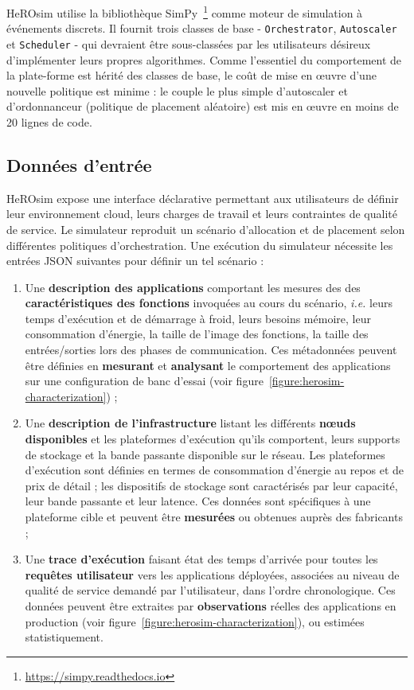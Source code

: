 HeROsim utilise la bibliothèque SimPy~\footnote{\href{https://simpy.readthedocs.io}{https://simpy.readthedocs.io}} comme moteur de simulation à événements discrets. Il fournit trois classes de base - \texttt{Orchestrator}, \texttt{Autoscaler} et \texttt{Scheduler} - qui devraient être sous-classées par les utilisateurs désireux d'implémenter leurs propres algorithmes. Comme l'essentiel du comportement de la plate-forme est hérité des classes de base, le coût de mise en œuvre d'une nouvelle politique est minime : le couple le plus simple d'autoscaler et d'ordonnanceur (politique de placement aléatoire) est mis en œuvre en moins de 20 lignes de code.

\subsection{Données d'entrée}

HeROsim expose une interface déclarative permettant aux utilisateurs de définir leur environnement cloud, leurs charges de travail et leurs contraintes de qualité de service. Le simulateur reproduit un scénario d'allocation et de placement selon différentes politiques d'orchestration. Une exécution du simulateur nécessite les entrées JSON suivantes pour définir un tel scénario :

\begin{enumerate}
    \item Une \textbf{description des applications} comportant les mesures des des \textbf{caractéristiques des fonctions} invoquées au cours du scénario, \textit{i.e.} leurs temps d'exécution et de démarrage à froid, leurs besoins mémoire, leur consommation d'énergie, la taille de l'image des fonctions, la taille des entrées/sorties lors des phases de communication. Ces métadonnées peuvent être définies en \textbf{mesurant} et \textbf{analysant} le comportement des applications sur une configuration de banc d'essai (voir figure~\ref{figure:herosim-characterization}) ;
    \item Une \textbf{description de l'infrastructure} listant les différents \textbf{nœuds disponibles} et les plateformes d'exécution qu'ils comportent, leurs supports de stockage et la bande passante disponible sur le réseau. Les plateformes d'exécution sont définies en termes de consommation d'énergie au repos et de prix de détail ; les dispositifs de stockage sont caractérisés par leur capacité, leur bande passante et leur latence. Ces données sont spécifiques à une plateforme cible et peuvent être \textbf{mesurées} ou obtenues auprès des fabricants ;
    \item Une \textbf{trace d'exécution} faisant état des temps d'arrivée pour toutes les \textbf{requêtes utilisateur} vers les applications déployées, associées au niveau de qualité de service demandé par l'utilisateur, dans l'ordre chronologique. Ces données peuvent être extraites par \textbf{observations} réelles des applications en production (voir figure~\ref{figure:herosim-characterization}), ou estimées statistiquement.
\end{enumerate}

